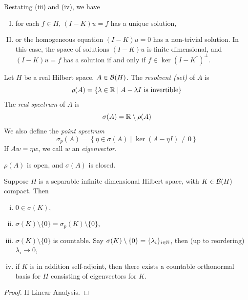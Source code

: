 \documentclass{article}
\begin{document}
Restating (iii) and (iv), we have
\begin{enumerate}[(I)]
    \item for each \(f \in H\), \((I - K)u = f\) has a unique solution,
    \item or the homogeneous equation \((I - K)u = 0\) has a non-trivial solution. In this case, the space of solutions \((I - K)u\) is finite dimensional, and \((I - K)u = f\) has a solution if and only if \(f \in \ker(I - K^\dagger)^\perp\).
\end{enumerate}

\begin{definition}
    Let \(H\) be a real Hilbert space, \(A \in \mathcal{B}(H)\). The \emph{resolvent (set)} of \(A\) is
    \[\rho(A) = \left\{\lambda \in \mathbb{R} \mid A - \lambda I \text{ is invertible}\right\}\]
    The \emph{real spectrum} of \(A\) is
    \[\sigma(A) = \mathbb{R} \setminus \rho(A)\]
    We also define the \emph{point spectrum}
    \[\sigma_p(A) = \left\{\eta \in \sigma(A) \mid \ker(A - \eta I) \ne 0\right\}\]
    If \(Aw = \eta w\), we call \(w\) an \emph{eigenvector}.
\end{definition}

\begin{remark}
    \(\rho(A)\) is open, and \(\sigma(A)\) is closed.
\end{remark}

\begin{theorem}
    \label{thm:compact-spectrum}
    Suppose \(H\) is a separable infinite dimensional Hilbert space, with \(K \in \mathcal{B}(H)\) compact. Then
    \begin{enumerate}[(i)]
        \item \(0 \in \sigma(K)\),
        \item \(\sigma(K) \setminus \{0\} = \sigma_p(K) \setminus \{0\}\),
        \item \(\sigma(K) \setminus \{0\}\) is countable. Say \(\sigma(K) \setminus \{0\} = \{\lambda_i\}_{i \in \mathbb{N}}\), then (up to reordering) \(\lambda_i \to 0\),
        \item if \(K\) is in addition self-adjoint, then there exists a countable orthonormal basis for \(H\) consisting of eigenvectors for \(K\).
    \end{enumerate}
\end{theorem}

\begin{proof}
    II Linear Analysis.
\end{proof}
\end{document}
